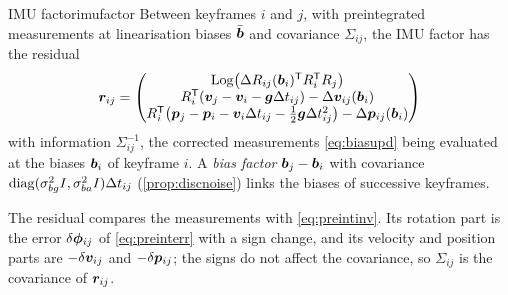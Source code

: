 \begin{definition}{IMU factor}{imufactor}
Between keyframes $i$ and $j$, with preintegrated measurements at
linearisation biases $\bar{\bm{b}}$ and covariance $\Sigma_{ij}$, the
IMU factor has the residual
\begin{equation}\label{eq:imures}
\bm{r}_{ij}=\begin{pmatrix}
\operatorname{Log}\bigl(\Delta R_{ij}(\bm{b}_i)^{\mathsf{T}} R_i^{\mathsf{T}} R_j\bigr)\\
R_i^{\mathsf{T}}(\bm{v}_j-\bm{v}_i-\bm{g}\Delta t_{ij})-\Delta\bm{v}_{ij}(
\bm{b}_i)\\
R_i^{\mathsf{T}}\bigl(\bm{p}_j-\bm{p}_i-\bm{v}_i\Delta t_{ij}-\frac12\bm{g}\Delta
t_{ij}^2\bigr)-\Delta\bm{p}_{ij}(\bm{b}_i)
\end{pmatrix}
\end{equation}
with information $\Sigma_{ij}^{-1}$, the corrected measurements
\eqref{eq:biasupd} being evaluated at the biases $\bm{b}_i$ of
keyframe $i$. A \emph{bias factor} $\bm{b}_j-\bm{b}_i$ with
covariance $\operatorname{diag}(\sigma_{bg}^2I,\sigma_{ba}^2I)\Delta t_{ij}$
(\cref{prop:discnoise}) links the biases of successive keyframes.
\end{definition}

The residual compares the measurements with \eqref{eq:preintinv}. Its
rotation part is the error $\delta\bm{\phi}_{ij}$ of \eqref{eq:preinterr}
with a sign change, and its velocity and position parts are $-\delta
\bm{v}_{ij}$ and $-\delta\bm{p}_{ij}$; the signs do not affect the
covariance, so $\Sigma_{ij}$ is the covariance of $\bm{r}_{ij}$.

